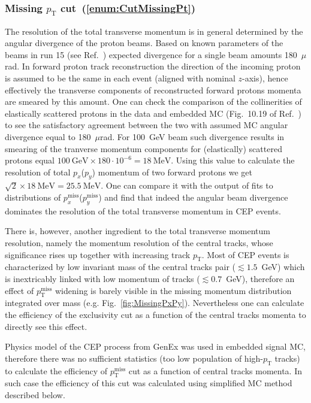 \subsubsection{Missing \texorpdfstring{$p_{\text{T}}$}{pT} cut~(\ref{enum:CutMissingPt})}\label{sec:ptMissCutEff}

The resolution of the total transverse momentum is in general determined by the angular divergence of the proton beams. Based on known parameters of the beams in run 15 (see Ref.~\cite{run15Overview}) expected divergence for a single beam amounts 180~$\mu$rad. In forward proton track reconstruction the direction of the incoming proton is assumed to be the same in each event (aligned with nominal $z$-axis), hence effectively the transverse components of reconstructed forward protons momenta are smeared by this amount. One can check the comparison of the collinerities of elastically scattered protons in the data and embedded MC (Fig.~10.19 of Ref.~\cite{supplementaryNote}) to see the satisfactory agreement between the two with assumed MC angular divergence equal to 180~$\mu$rad. For 100~GeV beam such divergence results in smearing of the tranverse momentum components for (elastically) scattered protons equal $100~\text{GeV}\times 180\cdot 10^{-6} = 18~\text{MeV}$. Using this value to calculate the resolution of total $p_{x}$($p_{y}$) momentum of two forward protons we get $\sqrt{2}\times 18~\text{MeV} = 25.5~\text{MeV}$. One can compare it with the output of fits to distributions of  $p_{x}^{\text{miss}}$($p_{y}^{\text{miss}}$) and find that indeed the angular beam divergence dominates the resolution of the total transverse momentum in CEP events. 

There is, however, another ingredient to the total transverse momentum resolution, namely the momentum resolution of the central tracks, whose significance rises up together with increasing track $p_{\text{T}}$. Most of CEP events is characterized by low invariant mass of the central tracks pair ($\lesssim 1.5$~GeV) which is inextricably linked with low momentum of tracks ($\lesssim 0.7$~GeV), therefore an effect of $p_{\text{T}}^{\text{miss}}$ widening is barely visible in the missing momentum distribution integrated over mass (e.g. Fig.~\ref{fig:MissingPxPy}). Nevertheless one can calculate the efficiency of the exclusivity cut as a function of the central tracks momenta to directly see this effect.

Physics model of the CEP process from GenEx was used in embedded signal MC, therefore there was no sufficient statistics (too low population of high-$p_{\text{T}}$ tracks) to calculate the efficiency of $p_{\text{T}}^{\text{miss}}$ cut as a function of central tracks momenta. In such case the efficiency of this cut was calculated using simplified MC method described below.

